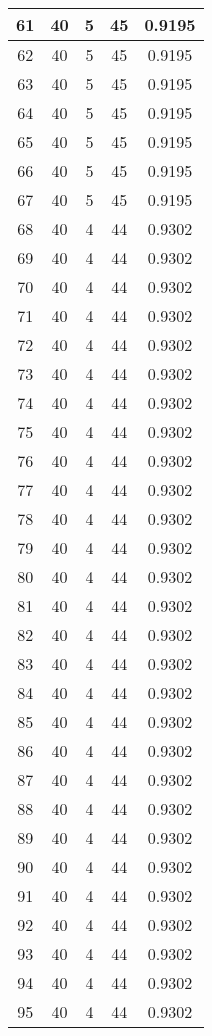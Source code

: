 \documentclass[letterpaper, 12pt]{article}
\begin{document}
\begin{longtable}{|c|c|c|c|c|}
61 & 40 & 5 & 45 & 0.9195 \\
\hline
62 & 40 & 5 & 45 & 0.9195 \\
\hline
63 & 40 & 5 & 45 & 0.9195 \\
\hline
64 & 40 & 5 & 45 & 0.9195 \\
\hline
65 & 40 & 5 & 45 & 0.9195 \\
\hline
66 & 40 & 5 & 45 & 0.9195 \\
\hline
67 & 40 & 5 & 45 & 0.9195 \\
\hline
68 & 40 & 4 & 44 & 0.9302 \\
\hline
69 & 40 & 4 & 44 & 0.9302 \\
\hline
70 & 40 & 4 & 44 & 0.9302 \\
\hline
71 & 40 & 4 & 44 & 0.9302 \\
\hline
72 & 40 & 4 & 44 & 0.9302 \\
\hline
73 & 40 & 4 & 44 & 0.9302 \\
\hline
74 & 40 & 4 & 44 & 0.9302 \\
\hline
75 & 40 & 4 & 44 & 0.9302 \\
\hline
76 & 40 & 4 & 44 & 0.9302 \\
\hline
77 & 40 & 4 & 44 & 0.9302 \\
\hline
78 & 40 & 4 & 44 & 0.9302 \\
\hline
79 & 40 & 4 & 44 & 0.9302 \\
\hline
80 & 40 & 4 & 44 & 0.9302 \\
\hline
81 & 40 & 4 & 44 & 0.9302 \\
\hline
82 & 40 & 4 & 44 & 0.9302 \\
\hline
83 & 40 & 4 & 44 & 0.9302 \\
\hline
84 & 40 & 4 & 44 & 0.9302 \\
\hline
85 & 40 & 4 & 44 & 0.9302 \\
\hline
86 & 40 & 4 & 44 & 0.9302 \\
\hline
87 & 40 & 4 & 44 & 0.9302 \\
\hline
88 & 40 & 4 & 44 & 0.9302 \\
\hline
89 & 40 & 4 & 44 & 0.9302 \\
\hline
90 & 40 & 4 & 44 & 0.9302 \\
\hline
91 & 40 & 4 & 44 & 0.9302 \\
\hline
92 & 40 & 4 & 44 & 0.9302 \\
\hline
93 & 40 & 4 & 44 & 0.9302 \\
\hline
94 & 40 & 4 & 44 & 0.9302 \\
\hline
95 & 40 & 4 & 44 & 0.9302 \\

\end{longtable}
\end{document}

